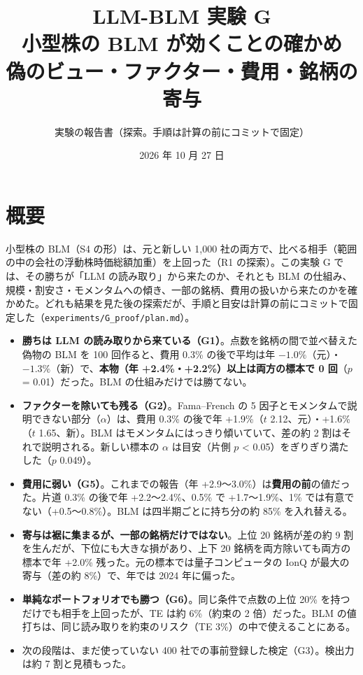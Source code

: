 \documentclass[xelatex,ja=standard,jafont=haranoaji,a4paper,10pt,openany]{bxjsreport}
\title{LLM-BLM 実験 G\\[6pt]
  \large 小型株の BLM が効くことの確かめ\\偽のビュー・ファクター・費用・銘柄の寄与}
\author{実験の報告書（探索。手順は計算の前にコミットで固定）}
\date{2026 年 10 月 27 日}
\newcommand{\code}[1]{\texttt{#1}}
\begin{document}
\maketitle

\chapter*{概要}

小型株の BLM（S4 の形）は、元と新しい 1,000 社の両方で、比べる相手（範囲の中の会社の浮動株時価総額加重）を上回った（R1 の探索）。この実験 G では、その勝ちが「LLM の読み取り」から来たのか、それとも BLM の仕組み、規模・割安さ・モメンタムへの傾き、一部の銘柄、費用の扱いから来たのかを確かめた。どれも結果を見た後の探索だが、手順と目安は計算の前にコミットで固定した（\code{experiments/G\_proof/plan.md}）。

\begin{keybox}[要点]
\begin{itemize}
\item \textbf{勝ちは LLM の読み取りから来ている（G1）}。点数を銘柄の間で並べ替えた偽物の BLM を 100 回作ると、費用 0.3\% の後で平均は年 $-1.0\%$（元）・$-1.3\%$（新）で、\textbf{本物（年 +2.4\%・+2.2\%）以上は両方の標本で 0 回}（$p$ = 0.01）だった。BLM の仕組みだけでは勝てない。
\item \textbf{ファクターを除いても残る（G2）}。Fama--French の 5 因子とモメンタムで説明できない部分（$\alpha$）は、費用 0.3\% の後で年 +1.9\%（$t$ 2.12、元）・+1.6\%（$t$ 1.65、新）。BLM はモメンタムにはっきり傾いていて、差の約 2 割はそれで説明される。新しい標本の $\alpha$ は目安（片側 $p$ < 0.05）をぎりぎり満たした（$p$ 0.049）。
\item \textbf{費用に弱い（G5）}。これまでの報告（年 +2.9〜3.0\%）は\textbf{費用の前}の値だった。片道 0.3\% の後で年 +2.2〜2.4\%、0.5\% で +1.7〜1.9\%、1\% では有意でない（+0.5〜0.8\%）。BLM は四半期ごとに持ち分の約 85\% を入れ替える。
\item \textbf{寄与は裾に集まるが、一部の銘柄だけではない}。上位 20 銘柄が差の約 9 割を生んだが、下位にも大きな損があり、上下 20 銘柄を両方除いても両方の標本で年 +2.0\% 残った。元の標本では量子コンピュータの IonQ が最大の寄与（差の約 8\%）で、年では 2024 年に偏った。
\item \textbf{単純なポートフォリオでも勝つ（G6）}。同じ条件で点数の上位 20\% を持つだけでも相手を上回ったが、TE は約 6\%（約束の 2 倍）だった。BLM の値打ちは、同じ読み取りを約束のリスク（TE 3\%）の中で使えることにある。
\item 次の段階は、まだ使っていない 400 社での事前登録した検定（G3）。検出力は約 7 割と見積もった。
\end{itemize}
\end{keybox}
\end{document}
